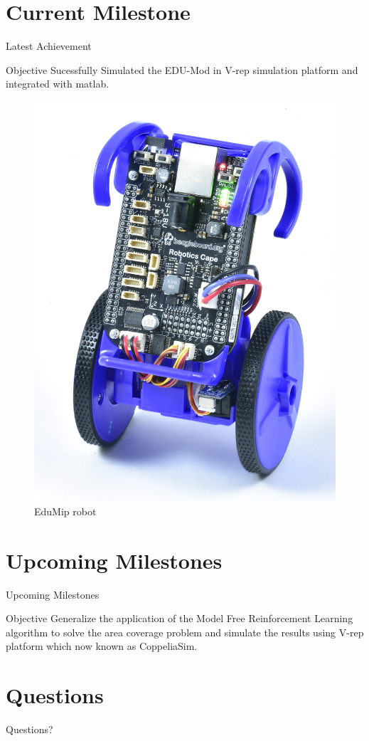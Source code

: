\documentclass{beamer}
\begin{document}
\section{Current Milestone}
\begin{frame}{Latest Achievement}
\begin{block}{Objective}
Sucessfully Simulated the EDU-Mod in V-rep simulation platform and integrated with matlab.
\end{block}
\begin{figure}
\includegraphics[scale=0.2]{figs/img/eduMip.jpeg}
\caption{EduMip robot}
\end{figure}
\end{frame}

\section{Upcoming Milestones}
\begin{frame}{Upcoming Milestones}
\begin{block}{Objective}
Generalize the application of the Model Free Reinforcement Learning algorithm to solve the area coverage problem and simulate the results using V-rep platform which now known as CoppeliaSim.
\end{block}
\end{frame}
\section*{Questions}
\begin{frame}
\begin{LARGE}
\begin{center}
Questions?
\end{center}
\end{LARGE}
\end{frame}
\end{document}
